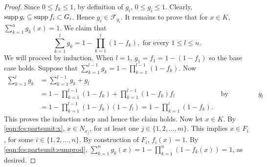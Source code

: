 \begin{proof}
Since $0 \leq f_k \leq 1$, by definition of $g_i$, $0 \leq g_i \leq 1$. Clearly, $\operatorname{supp} g_i \subseteq \operatorname{supp} f_i \subset G_i$. Hence $g_i \in \mathcal{F}_{g_i}$. It remains to prove that for $x \in K$, $\sum_{k=1}^n g_k(x) = 1$. We claim that \begin{equation}
     \label{eqn:fcs:partsunit:sumprod}
    \sum_{k = 1}^l g_k = 1 - \prod_{k = 1}^l (1 - f_k), \text{  for every $1 \leq l \leq n$.}
\end{equation} We will proceed by induction. When $l = 1$, $g_1 = f_1 = 1 - (1 - f_1)$ so the base case holds. Suppose that $\sum_{k = 1}^{l - 1} g_k = 1 - \prod_{k = 1}^{l-1} (1 - f_k)$. Now
\begin{align*}
       \sum_{k = 1}^l g_k &= \sum_{k = 1}^{l - 1} g_k + g_l & \\  
                          &= 1 - \prod_{k = 1}^{l-1} (1 - f_k) + \prod_{k = 1}^{l-1} (1 - f_k) f_l & \text{ by induction, definition of $g_l$}\\
                          &= 1 - \prod_{k = 1}^{l-1} (1 - f_k) (1 - f_l) =  1 - \prod_{k = 1}^l (1 - f_k).
\end{align*}
This proves the induction step and hence the claim holds. Now let $x \in K$. By \ref{eqn:fcs:partsunit:x}, $x \in N_{x_j}$, for at least one $j \in \{ 1, 2, \ldots, m\}$. This implies $x \in F_i$, for some $i \in \{1,2,\ldots, n\}$. By construction of $F_i$, $f_i (x) = 1$. By \ref{eqn:fcs:partsunit:sumprod}, $\sum_{k = 1}^n g_k(x) = 1 - \prod_{k = 1}^n (1 - f_k(x)) = 1$, as desired.
\end{proof}
